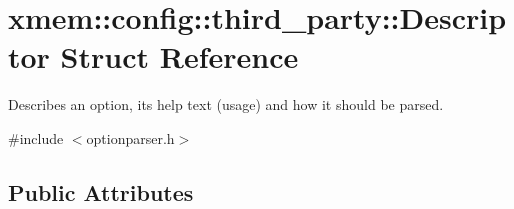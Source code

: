 \hypertarget{structxmem_1_1config_1_1third__party_1_1_descriptor}{}\section{xmem\+:\+:config\+:\+:third\+\_\+party\+:\+:Descriptor Struct Reference}
\label{structxmem_1_1config_1_1third__party_1_1_descriptor}


Describes an option, its help text (usage) and how it should be parsed.  




{\ttfamily \#include $<$optionparser.\+h$>$}

\subsection*{Public Attributes}
